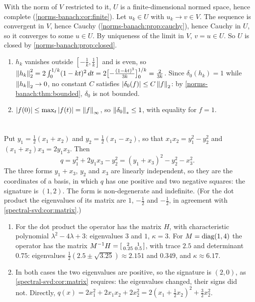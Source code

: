 With the norm of $V$ restricted to it, $U$ is a finite-dimensional normed
space, hence complete (\cref{norms-banach:cor:finite}). Let $u_k\in U$
with $u_k\to v\in V$. The sequence is convergent in $V$, hence Cauchy
(\cref{norms-banach:prop:cauchy}), hence Cauchy in $U$, so it converges
to some $u\in U$. By uniqueness of the limit in $V$, $v = u\in U$. So $U$
is closed by \cref{norms-banach:prop:closed}.

\begin{enumerate}[nosep]
  \item $h_k$ vanishes outside $[-\frac1k, \frac1k]$ and is even, so
        $\left\|h_k\right\|_2^2 = 2\int_0^{1/k}(1 - kt)^2\,dt
        = 2\bigl[-\frac{(1 - kt)^3}{3k}\bigr]_0^{1/k} = \frac2{3k}$. Since
        $\delta_0(h_k) = 1$ while $\left\|h_k\right\|_2\to0$, no constant $C$
        satisfies $\left|\delta_0(f)\right|\leq C\left\|f\right\|_2$: by
        \cref{norms-banach:thm:bounded}, $\delta_0$ is not bounded.
  \item $\left|f(0)\right|\leq\max_t\left|f(t)\right| = \left\|f\right\|_\infty$, so
        $\left\|\delta_0\right\|_*\leq1$, with equality for $f = 1$.
\end{enumerate}

\section{}

Put $y_1 = \frac12(x_1 + x_2)$ and $y_2 = \frac12(x_1 - x_2)$, so that
$x_1x_2 = y_1^2 - y_2^2$ and $(x_1 + x_2)x_3 = 2y_1x_3$. Then
\[
  q = y_1^2 + 2y_1x_3 - y_2^2 = (y_1 + x_3)^2 - y_2^2 - x_3^2 .
\]
The three forms $y_1 + x_3$, $y_2$ and $x_3$ are linearly independent, so
they are the coordinates of a basis, in which $q$ has one positive and two
negative squares: the signature is $(1, 2)$. The form is non-degenerate
and indefinite. (For the dot product the eigenvalues of its matrix are
$1$, $-\frac12$ and $-\frac12$, in agreement with
\cref{spectral-svd:cor:matrix}.)

\begin{enumerate}[nosep]
  \item For the dot product the operator has the matrix $H$, with
        characteristic polynomial $\lambda^2 - 4\lambda + 3$: eigenvalues
        $3$ and $1$, $\kappa = 3$. For $M = \operatorname{diag}(1, 4)$ the operator has
        the matrix
        $M^{-1}H = \begin{bsmallmatrix}2 & 1\\0.25 & 0.5\end{bsmallmatrix}$,
        with trace $2.5$ and determinant $0.75$: eigenvalues
        $\frac12(2.5\pm\sqrt{3.25})\approx2.151$ and $0.349$, and
        $\kappa\approx6.17$.
  \item In both cases the two eigenvalues are positive, so the signature
        is $(2, 0)$, as \cref{spectral-svd:cor:matrix} requires: the
        eigenvalues changed, their signs did not. Directly,
        $q(x) = 2x_1^2 + 2x_1x_2 + 2x_2^2
        = 2(x_1 + \frac12x_2)^2 + \frac32x_2^2$.
\end{enumerate}

